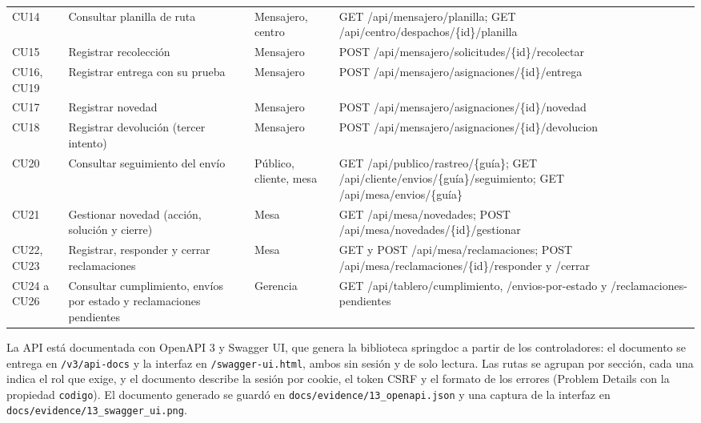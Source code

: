 {\begin{longtable}{L{1.7cm} L{3.4cm} L{2.0cm} L{6.0cm}}
CU14 & Consultar planilla de ruta & Mensajero, centro & GET /api/\allowbreak{}mensajero/\allowbreak{}planilla; GET /api/\allowbreak{}centro/\allowbreak{}despachos/\allowbreak{}\{id\}/\allowbreak{}planilla \\
CU15 & Registrar recolección & Mensajero & POST /api/\allowbreak{}mensajero/\allowbreak{}solicitudes/\allowbreak{}\{id\}/\allowbreak{}recolectar \\
CU16, CU19 & Registrar entrega con su prueba & Mensajero & POST /api/\allowbreak{}mensajero/\allowbreak{}asignaciones/\allowbreak{}\{id\}/\allowbreak{}entrega \\
CU17 & Registrar novedad & Mensajero & POST /api/\allowbreak{}mensajero/\allowbreak{}asignaciones/\allowbreak{}\{id\}/\allowbreak{}novedad \\
CU18 & Registrar devolución (tercer intento) & Mensajero & POST /api/\allowbreak{}mensajero/\allowbreak{}asignaciones/\allowbreak{}\{id\}/\allowbreak{}devolucion \\
CU20 & Consultar seguimiento del envío & Público, cliente, mesa & GET /api/\allowbreak{}publico/\allowbreak{}rastreo/\allowbreak{}\{guía\}; GET /api/\allowbreak{}cliente/\allowbreak{}envios/\allowbreak{}\{guía\}/\allowbreak{}seguimiento; GET /api/\allowbreak{}mesa/\allowbreak{}envios/\allowbreak{}\{guía\} \\
CU21 & Gestionar novedad (acción, solución y cierre) & Mesa & GET /api/\allowbreak{}mesa/\allowbreak{}novedades; POST /api/\allowbreak{}mesa/\allowbreak{}novedades/\allowbreak{}\{id\}/\allowbreak{}gestionar \\
CU22, CU23 & Registrar, responder y cerrar reclamaciones & Mesa & GET y POST /api/\allowbreak{}mesa/\allowbreak{}reclamaciones; POST /api/\allowbreak{}mesa/\allowbreak{}reclamaciones/\allowbreak{}\{id\}/\allowbreak{}responder y /\allowbreak{}cerrar \\
CU24 a CU26 & Consultar cumplimiento, envíos por estado y reclamaciones pendientes & Gerencia & GET /api/\allowbreak{}tablero/\allowbreak{}cumplimiento, /\allowbreak{}envios-por-estado y /\allowbreak{}reclamaciones-pendientes \\
\end{longtable}
\par}

La API está documentada con OpenAPI 3 y Swagger UI, que genera la
biblioteca springdoc a partir de los controladores: el documento se entrega
en \texttt{/v3/api-docs} y la interfaz en \texttt{/swagger-ui.html}, ambos sin
sesión y de solo lectura. Las rutas se agrupan por sección, cada una indica el
rol que exige, y el documento describe la sesión por cookie, el token CSRF y el
formato de los errores (Problem Details con la propiedad \texttt{codigo}). El
documento generado se guardó en \texttt{docs/evidence/13\_openapi.json} y una
captura de la interfaz en \texttt{docs/evidence/13\_swagger\_ui.png}.


